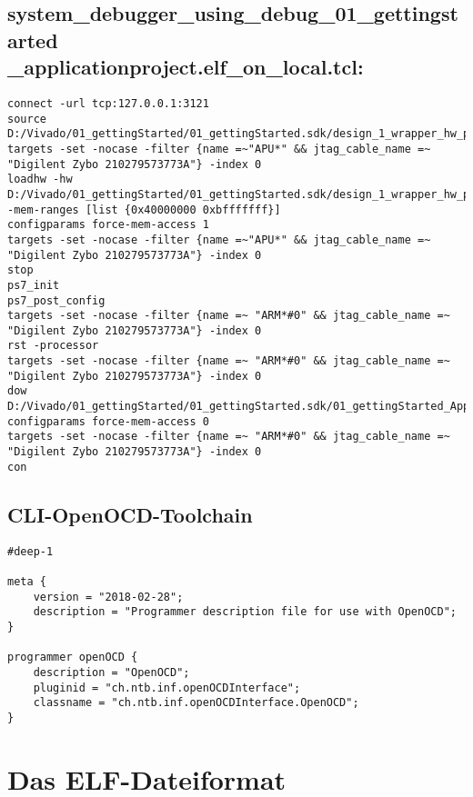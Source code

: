 \subsection{system\_debugger\_using\_debug\_01\_gettingstarted\\\_applicationproject.elf\_on\_local.tcl:}
\label{anhang:elf_on_local.tcl}
\lstset{language=plain}
\begin{lstlisting}
connect -url tcp:127.0.0.1:3121
source D:/Vivado/01_gettingStarted/01_gettingStarted.sdk/design_1_wrapper_hw_platform_0/ps7_init.tcl
targets -set -nocase -filter {name =~"APU*" && jtag_cable_name =~ "Digilent Zybo 210279573773A"} -index 0
loadhw -hw D:/Vivado/01_gettingStarted/01_gettingStarted.sdk/design_1_wrapper_hw_platform_0/system.hdf -mem-ranges [list {0x40000000 0xbfffffff}]
configparams force-mem-access 1
targets -set -nocase -filter {name =~"APU*" && jtag_cable_name =~ "Digilent Zybo 210279573773A"} -index 0
stop
ps7_init
ps7_post_config
targets -set -nocase -filter {name =~ "ARM*#0" && jtag_cable_name =~ "Digilent Zybo 210279573773A"} -index 0
rst -processor
targets -set -nocase -filter {name =~ "ARM*#0" && jtag_cable_name =~ "Digilent Zybo 210279573773A"} -index 0
dow D:/Vivado/01_gettingStarted/01_gettingStarted.sdk/01_gettingStarted_ApplicationProject/Debug/01_gettingStarted_ApplicationProject.elf
configparams force-mem-access 0
targets -set -nocase -filter {name =~ "ARM*#0" && jtag_cable_name =~ "Digilent Zybo 210279573773A"} -index 0
con
\end{lstlisting}


\subsection{CLI-OpenOCD-Toolchain}
\label{anhang:CLI-OpenOCD-Toolchain}
\lstset{language=java}
\begin{lstlisting}
#deep-1

meta {
	version = "2018-02-28";
	description = "Programmer description file for use with OpenOCD";
}

programmer openOCD {
	description = "OpenOCD";
	pluginid = "ch.ntb.inf.openOCDInterface";
	classname = "ch.ntb.inf.openOCDInterface.OpenOCD";
}
\end{lstlisting}






\section{Das ELF-Dateiformat}
\label{anhang:DasELF-Dateiformat}
